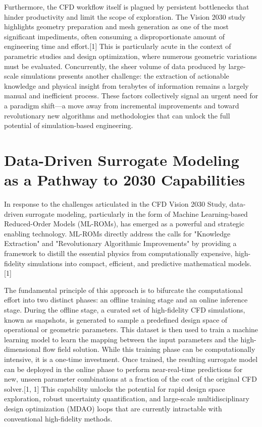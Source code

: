 \documentclass[12pt, a4paper]{report}
\begin{document}
Furthermore, the CFD workflow itself is plagued by persistent bottlenecks that hinder productivity and limit the scope of exploration. The Vision 2030 study highlights geometry preparation and mesh generation as one of the most significant impediments, often consuming a disproportionate amount of engineering time and effort.[1] This is particularly acute in the context of parametric studies and design optimization, where numerous geometric variations must be evaluated. Concurrently, the sheer volume of data produced by large-scale simulations presents another challenge: the extraction of actionable knowledge and physical insight from terabytes of information remains a largely manual and inefficient process. These factors collectively signal an urgent need for a paradigm shift—a move away from incremental improvements and toward revolutionary new algorithms and methodologies that can unlock the full potential of simulation-based engineering.

\section{Data-Driven Surrogate Modeling as a Pathway to 2030 Capabilities}

In response to the challenges articulated in the CFD Vision 2030 Study, data-driven surrogate modeling, particularly in the form of Machine Learning-based Reduced-Order Models (ML-ROMs), has emerged as a powerful and strategic enabling technology. ML-ROMs directly address the calls for "Knowledge Extraction" and "Revolutionary Algorithmic Improvements" by providing a framework to distill the essential physics from computationally expensive, high-fidelity simulations into compact, efficient, and predictive mathematical models.[1]

The fundamental principle of this approach is to bifurcate the computational effort into two distinct phases: an offline training stage and an online inference stage. During the offline stage, a curated set of high-fidelity CFD simulations, known as snapshots, is generated to sample a predefined design space of operational or geometric parameters. This dataset is then used to train a machine learning model to learn the mapping between the input parameters and the high-dimensional flow field solution. While this training phase can be computationally intensive, it is a one-time investment. Once trained, the resulting surrogate model can be deployed in the online phase to perform near-real-time predictions for new, unseen parameter combinations at a fraction of the cost of the original CFD solver.[1, 1] This capability unlocks the potential for rapid design space exploration, robust uncertainty quantification, and large-scale multidisciplinary design optimization (MDAO) loops that are currently intractable with conventional high-fidelity methods.
\end{document}
